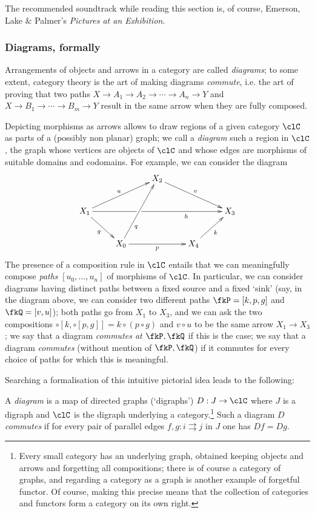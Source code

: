 \documentclass[11pt]{article}
\begin{document}
The recommended soundtrack while reading this section is, of course, Emerson, Lake \& Palmer's \emph{Pictures at an Exhibition}.
\subsubsection{Diagrams, formally}
Arrangements of objects and arrows in a category are called \emph{diagrams}; to some extent, category theory is the art of making diagrams \emph{commute}, i.e. the art of proving that two paths $X\to A_1\to A_2 \to\cdots\to A_n \to Y$ and $X \to B_1\to\cdots\to B_m \to Y$ result in the same arrow when they are fully composed.

\begin{remark}\leavevmode
	Depicting morphisms as arrows allows to draw regions of a given category $\clC$ as parts of a (possibly non planar) graph; we call a \emph{diagram} such a region in $\clC$, the graph whose vertices are objects of $\clC$ and whose edges are morphisms of suitable domains and codomains. For example, we can consider the diagram
	\[
		\vcenter{\xymatrix{
				&&X_2\ar[drr]^v&& \\
				X_1\ar[dr]_g\ar[urr]^u\ar[rrrr]|(.375)\hole_(.7)h&&&&X_3\\
				& X_0 \ar[uur]_(.3)q\ar[rr]_p&& X_4 \ar[ur]_k&
			}}
	\]
	The presence of a composition rule in $\clC$ entails that we can meaningfully compose \emph{paths} $[u_0,\dots, u_n]$ of morphisms of $\clC$. In particular, we can consider diagrams having distinct paths between a fixed source and a fixed `sink' (say, in the diagram above, we can consider two different paths $\fkP = [k,p,g]$ and $\fkQ = [v,u]$); both paths go from $X_1$ to $X_3$, and we can ask the two compositions $\circ[k,\circ [p,g]] = k\circ (p\circ g)$ and $v\circ u$ to be the same arrow $X_1\to X_3$; we say that a diagram \emph{commutes at $\fkP,\fkQ$} if this is the case; we say that a diagram \emph{commutes} (without mention of $\fkP, \fkQ$) if it commutes for every choice of paths for which this is meaningful.
\end{remark}
Searching a formalisation of this intuitive pictorial idea leads to the following:
\begin{definition}
	A \emph{diagram} is a map of directed graphs (`digraphs') $D : J \to \clC$ where $J$ is a digraph and $\clC$ is the digraph underlying a category.\footnote{Every small category has an underlying graph, obtained keeping objects and arrows and forgetting all compositions; there is of course a category of graphs, and regarding a category as a graph is another example of forgetful functor. Of course, making this precise means that the collection of categories and functors form a category on its own right.} Such a diagram $D$ \emph{commutes} if for every pair of parallel edges $f,g : i\rightrightarrows j$ in $J$ one has $Df = Dg$.
\end{definition}
\end{document}
